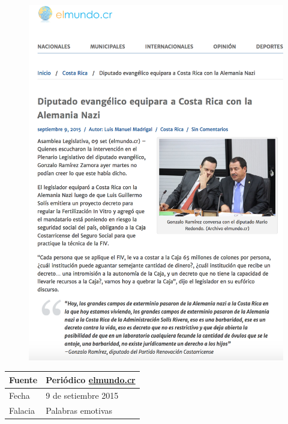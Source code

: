 \documentclass[times]{simauth}
\begin{document}
\begin{figure}[h]
    \centering
    \includegraphics[width=15cm]{costarica-nazi-fiv}
    \label{fig:falacia1}
\end{figure}

\newpage

\begin{table}[h!]
    \begin{tabular}{ll} 
        \toprule[1.5pt]
        Fuente & Periódico \href{http://elmundo.cr}{elmundo.cr}\\
        \midrule[0.5pt]
        Fecha  & 9 de setiembre 2015\\
        \midrule[0.5pt]
        Falacia & Palabras emotivas \\
        \bottomrule[1.5pt]
    \end{tabular} 
\end{table}
\end{document}
